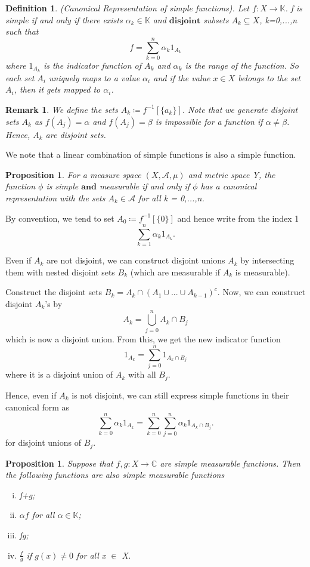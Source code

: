 \documentclass[twoside]{article}
\newtheorem{proposition}[theorem]{Proposition}
\newtheorem{remark}[theorem]{Remark}
\newtheorem{definition}[theorem]{Definition}
\begin{document}
\begin{definition}
(Canonical Representation of simple functions). Let $f: X \rightarrow \mathbb{K}$. f is simple if and only if there exists $\alpha_k \in \mathbb{K}$ and $\textbf{disjoint}$ subsets $A_k \subseteq X$, k=0,...,n such that
$$
f = \sum_{k=0}^n\alpha_k1_{A_k}
$$
where $1_{A_k}$ is the indicator function of $A_k$ and $\alpha_k$ is the range of the function. So each set $A_i$ uniquely maps to a value $\alpha_i$ and if the value $x \in X$ belongs to the set $A_i$, then it gets mapped to $\alpha_i$. 
\end{definition}

\begin{remark}
We define the sets $A_k \coloneqq f^{-1}[\{a_k\}]$. Note that we generate disjoint sets $A_k$ as $f(A_j) = \alpha$ and $f(A_j) = \beta$ is impossible for a function if $\alpha \neq \beta$. Hence, $A_k$ are disjoint sets. 
\end{remark}


We note that a linear combination of simple functions is also a simple function.

\begin{proposition}
For a measure space $(X, \mathcal{A}, \mu)$ and metric space Y, the function $\phi$ is simple $\textbf{and}$ measurable if and only if $\phi$ has a canonical representation with the sets $A_k \in \mathcal{A}$ for all k = 0,...,n. 
\end{proposition}


By convention, we tend to set $A_0 \coloneqq f^{-1}[\{0\}]$ and hence write from the index 1
$$
\sum_{k=1}^n\alpha_k1_{A_k}.
$$


Even if $A_k$ are not disjoint, we can construct disjoint unions $A_k$ by intersecting them with nested disjoint sets $B_k$ (which are measurable if $A_k$ is measurable). 

Construct the disjoint sets $B_k = A_k \cap (A_1 \cup ... \cup A_{k-1})^c$. Now, we can construct disjoint $A_k$'s by
$$
A_k = \bigcup_{j=0}^{n}A_k \cap B_j
$$
which is now a disjoint union. From this, we get the new indicator function 
$$
1_{A_k} = \sum_{j=0}^n1_{A_k \cap B_j}
$$
where it is a disjoint union of $A_k$ with all $B_j$.

Hence, even if $A_k$ is not disjoint, we can still express simple functions in their canonical form as
$$
\sum_{k=0}^{n}\alpha_k1_{A_k} = \sum_{k=0}^n\sum_{j=0}^n\alpha_k1_{A_k \cap B_j}.
$$
for disjoint unions of $B_j$.


\begin{proposition}
Suppose that $f,g: X \rightarrow \mathbb{C}$ are simple measurable functions. Then the following functions are also simple measurable functions
\begin{enumerate}[(i)]
    \item f+g;
    \item $\alpha f$ for all $\alpha \in \mathbb{K}$;
    \item fg;
    \item $\frac{f}{g}$ if $g(x) \neq 0$ for all x $\in$ X.
\end{enumerate}
\end{proposition}
\end{document}
